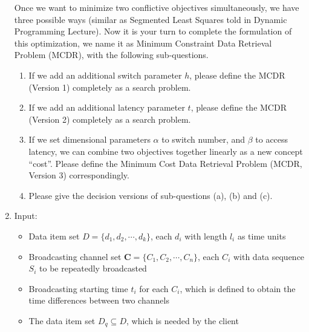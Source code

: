 \documentclass[12pt,a4paper]{article}
\makeatletter
\newtheorem*{solution}{Solution}
\theoremstyle{definition}
\renewenvironment{solution}[1][Solution] {\par\pushQED{\qed}\normalfont\topsep6\p@\@plus6\p@\relax\trivlist\item[\hskip\labelsep\bfseries#1\@addpunct{.}]\ignorespaces}{\popQED\endtrivlist\@endpefalse} \makeatother
\makeatother
\begin{document}
\begin{enumerate}
Once we want to minimize two conflictive objectives simultaneously, we have three possible ways (similar as Segmented Least Squares told in Dynamic Programming Lecture). Now it is your turn to complete the formulation of this optimization, we name it as Minimum Constraint Data Retrieval Problem (MCDR), with the following sub-questions.
\begin{enumerate}
	\item If we add an additional switch parameter $h$, please define the MCDR (Version 1) completely as a search problem.
	\item If we add an additional latency parameter $t$, please define the MCDR (Version 2) completely as a search problem.
	\item If we set dimensional parameters $\alpha$ to switch number, and $\beta$ to access latency, we can combine two objectives together linearly as a new concept ``cost''. Please define the Minimum Cost Data Retrieval Problem (MCDR, Version 3) correspondingly.
	\item Please give the decision versions of sub-questions (a), (b) and (c).
\end{enumerate}
\begin{solution}
	\hfill \break
	Input: 
	\begin{itemize}
		\item
		Data item set $D = \{d_1, d_2,\cdots, d_k\}$, each $d_i$ with length $l_i$ as time units
		\item
		Broadcasting channel set $\mathbf{C}=\{C_1, C_2, \cdots, C_n\}$, each $C_i$ with data sequence $S_i$ to be repeatedly broadcasted
		\item
		Broadcasting starting time $t_i$ for each $C_i$, which is defined to obtain the time differences between two channels
		\item
		The data item set $D_q \subseteq D$, which is needed by the client
	\end{itemize}


\end{solution}
\end{enumerate}
\end{document}
